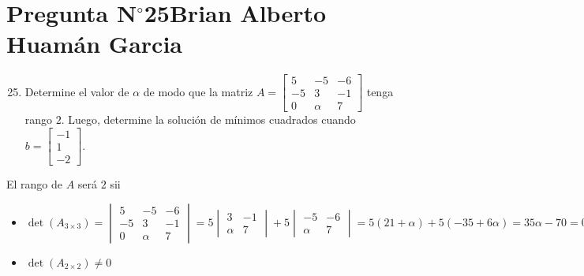 \section{Pregunta N$^{\circ}$25\qquad Brian Alberto Huamán Garcia}

\begin{frame}
	\begin{enumerate}\setcounter{enumi}{24}
		\item

		      Determine el valor de $\alpha$ de modo que la matriz
		      \begin{math}
			      A=
			      \begin{bmatrix}
				      5  & -5     & -6 \\
				      -5 & 3      & -1 \\
				      0  & \alpha & 7
			      \end{bmatrix}
		      \end{math}
		      tenga rango $2$.
		      Luego, determine la solución de mínimos cuadrados cuando
		      \begin{math}
			      b=
			      \begin{bmatrix}
				      -1 \\
				      1  \\
				      -2
			      \end{bmatrix}
		      \end{math}.
	\end{enumerate}

	\begin{solution}
		El rango de $A$ será $2$ sii
		\begin{itemize}
			\item

			      \begin{equation*}
				      \det\left(A_{3\times 3}\right)=
				      \begin{vmatrix}
					      5  & -5     & -6 \\
					      -5 & 3      & -1 \\
					      0  & \alpha & 7
				      \end{vmatrix}=
				      5\begin{vmatrix}
					      3      & -1 \\
					      \alpha & 7
				      \end{vmatrix}+
				      5\begin{vmatrix}
					      -5     & -6 \\
					      \alpha & 7
				      \end{vmatrix}=
				      5\left(21+\alpha\right)+
				      5\left(-35+6\alpha\right)=
				      35\alpha-70=
				      0\iff
				      \alpha=0.
			      \end{equation*}

			\item

			      \begin{math}
				      \det\left(A_{2\times 2}\right)\neq
				      0
			      \end{math}

		\end{itemize}
	\end{solution}
\end{frame}

